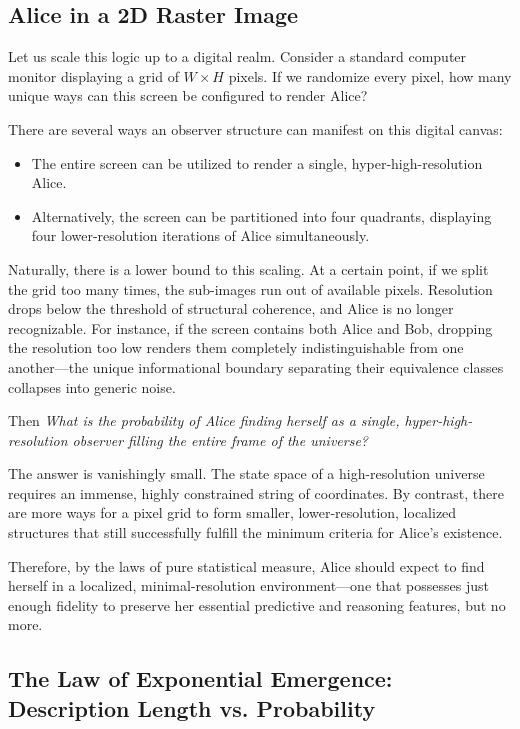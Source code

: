 \subsection{Alice in a 2D Raster Image}

Let us scale this logic up to a digital realm.
Consider a standard computer monitor displaying a grid of $W \times H$ pixels.
If we randomize every pixel, how many unique ways can this screen be configured to render Alice?

There are several ways an observer structure can manifest on this digital canvas:
\begin{itemize}
    \item The entire screen can be utilized to render a single, hyper-high-resolution Alice.
    \item Alternatively, the screen can be partitioned into four quadrants, displaying four lower-resolution iterations of Alice simultaneously.
\end{itemize}

Naturally, there is a lower bound to this scaling.
At a certain point, if we split the grid too many times, the sub-images run out of available pixels.
Resolution drops below the threshold of structural coherence, and Alice is no longer recognizable.
For instance, if the screen contains both Alice and Bob, dropping the resolution too low renders them completely indistinguishable from one another—the unique informational boundary separating their equivalence classes collapses into generic noise.

Then \emph{What is the probability of Alice finding herself as a single, hyper-high-resolution observer filling the entire frame of the universe?}

The answer is vanishingly small. The state space of a high-resolution universe requires an immense, highly constrained string of coordinates.
By contrast, there are more ways for a pixel grid to form smaller, lower-resolution, localized structures that still successfully fulfill the minimum criteria for Alice's existence. 

Therefore, by the laws of pure statistical measure,
Alice should expect to find herself in a localized, minimal-resolution environment—one that possesses just enough fidelity to preserve her essential predictive and reasoning features, but no more. 



\subsection{The Law of Exponential Emergence: Description Length vs. Probability}

